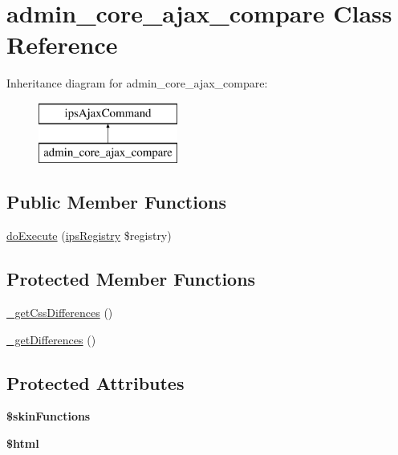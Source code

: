 \hypertarget{classadmin__core__ajax__compare}{\section{admin\-\_\-core\-\_\-ajax\-\_\-compare Class Reference}
\label{classadmin__core__ajax__compare}
}
Inheritance diagram for admin\-\_\-core\-\_\-ajax\-\_\-compare\-:\begin{figure}[H]
\begin{center}
\leavevmode
\includegraphics[height=2.000000cm]{classadmin__core__ajax__compare}
\end{center}
\end{figure}
\subsection*{Public Member Functions}
\begin{DoxyCompactItemize}
\item 
\hyperlink{classadmin__core__ajax__compare_afbc4e912a0604b94d47d66744c64d8ba}{do\-Execute} (\hyperlink{classips_registry}{ips\-Registry} \$registry)
\end{DoxyCompactItemize}
\subsection*{Protected Member Functions}
\begin{DoxyCompactItemize}
\item 
\hyperlink{classadmin__core__ajax__compare_a5c1c62fa826b31cfa2541b903f0b0453}{\-\_\-get\-Css\-Differences} ()
\item 
\hyperlink{classadmin__core__ajax__compare_af22aa1438c82b94a2d73752a0db231aa}{\-\_\-get\-Differences} ()
\end{DoxyCompactItemize}
\subsection*{Protected Attributes}
\begin{DoxyCompactItemize}
\item 
\hypertarget{classadmin__core__ajax__compare_a41d90687021c6f16184b43666509dee8}{{\bfseries \$skin\-Functions}}\label{classadmin__core__ajax__compare_a41d90687021c6f16184b43666509dee8}

\item 
\hypertarget{classadmin__core__ajax__compare_a6f96e7fc92441776c9d1cd3386663b40}{{\bfseries \$html}}\label{classadmin__core__ajax__compare_a6f96e7fc92441776c9d1cd3386663b40}

\end{DoxyCompactItemize}


